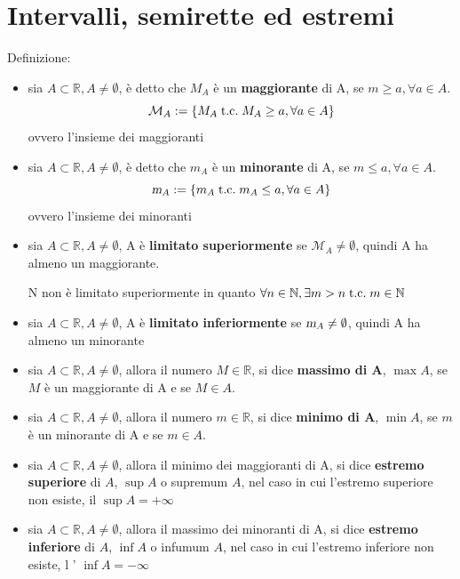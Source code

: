 \documentclass[a4paper, 12pt, openany]{book}
\begin{document}
	\section{Intervalli, semirette ed estremi}
	Definizione:
	\begin{itemize}
		\item sia $A \subset \mathbb{R}, A \not = \emptyset$, è detto che $M_A$ è un \textbf{maggiorante} di A, se $m \geq a, \forall a \in A$.
		\[\mathcal{M}_A := \{ M_A \;\text{t.c.}\; M_A \geq a, \forall a \in A\}\]
		ovvero l'insieme dei maggioranti
		\item sia $A \subset \mathbb{R}, A \not = \emptyset$, è detto che $m_A$ è un \textbf{minorante} di A, se $m \leq a, \forall a \in A$.
		\[\textsl{m}_A := \{ m_A \;\text{t.c.}\; m_A \leq a, \forall a \in A\}\]
		ovvero l'insieme dei minoranti
		\item sia $A \subset \mathbb{R}, A \not = \emptyset$, A è \textbf{limitato superiormente} se $\mathcal{M}_A \not = \emptyset$, quindi A ha almeno un maggiorante.
		
		N non è limitato superiormente in quanto $\forall n \in \mathbb{N}, \exists m > n \;\text{t.c.}\; m \in \mathbb{N}$
		\item sia $A \subset \mathbb{R}, A \not = \emptyset$, A è \textbf{limitato inferiormente} se $\textsl{m}_A \not = \emptyset$, quindi A ha almeno un minorante
		
		\item sia $A \subset \mathbb{R}, A \not = \emptyset$, allora il numero $M \in \mathbb{R}$, si dice \textbf{massimo di A}, $\max A$, se $M$ è un maggiorante di A e se $M \in A$.
		
		\item sia $A \subset \mathbb{R}, A \not = \emptyset$, allora il numero $m \in \mathbb{R}$, si dice \textbf{minimo di A}, $\min A$, se $m$ è un minorante di A e se $m \in A$.		
		
		\item sia $A \subset \mathbb{R}, A \not = \emptyset$, allora il minimo dei maggioranti di A, si dice \textbf{estremo superiore} di $A$, $\sup A$ o supremum $A$, nel caso in cui l'estremo superiore non esiste, il $\sup A = +\infty$
		
		\item sia $A \subset \mathbb{R}, A \not = \emptyset$, allora il massimo dei minoranti di A, si dice \textbf{estremo inferiore} di $A$, $\inf A$ o infumum $A$, nel caso in cui l'estremo inferiore non esiste, l ' $\inf A = -\infty$
	\end{itemize}
	
\end{document}
